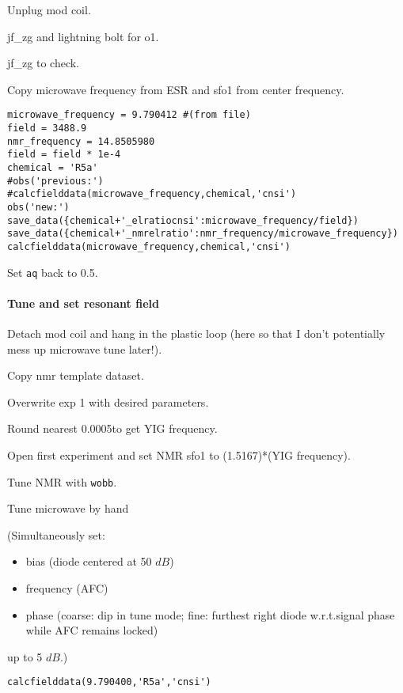 \begin{scriptsize}
\begin{python}[off]
Unplug mod coil.

jf\_zg and lightning bolt for o1.  

jf\_zg to check.

Copy microwave frequency from ESR and sfo1 from center frequency.  


\begin{lstlisting}
microwave_frequency = 9.790412 #(from file)
field = 3488.9
nmr_frequency = 14.8505980
field = field * 1e-4
chemical = 'R5a'
#obs('previous:')
#calcfielddata(microwave_frequency,chemical,'cnsi')
obs('new:')
save_data({chemical+'_elratiocnsi':microwave_frequency/field})
save_data({chemical+'_nmrelratio':nmr_frequency/microwave_frequency})
calcfielddata(microwave_frequency,chemical,'cnsi')
\end{lstlisting}

Set \texttt{aq} back to 0.5.

\paragraph{Tune and set resonant field}
Detach mod coil and hang in the plastic loop (here so that I don't potentially mess up microwave tune later!).

Copy nmr template dataset.

Overwrite exp 1 with desired parameters.

Round nearest 0.0005\GHz to get YIG frequency.

Open first experiment and set NMR sfo1 to (1.5167)*(YIG frequency).

Tune NMR with {\tt wobb}.


Tune microwave by hand
{\small (Simultaneously set:
\begin{itemize}
    \item bias (diode centered at 50 $dB$)
    \item frequency (AFC)
    \item phase (coarse: dip in tune mode; fine: furthest right diode w.r.t.signal phase while AFC remains locked)
\end{itemize}
up to 5 $dB$.)}
\begin{lstlisting}
calcfielddata(9.790400,'R5a','cnsi')
\end{lstlisting}


\end{python}
\end{scriptsize}
